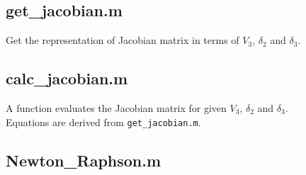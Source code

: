 \documentclass{article}
\begin{document}
\subsection*{get\_jacobian.m}
Get the representation of Jacobian matrix in terms of $V_3$, $\delta_2$ and $\delta_3$.


\subsection*{calc\_jacobian.m}
A function evaluates the Jacobian matrix for given $V_3$, $\delta_2$ and $\delta_3$.\\
Equations are derived from \texttt{get\_jacobian.m}.


\newpage
\subsection*{Newton\_Raphson.m}


\end{document}
